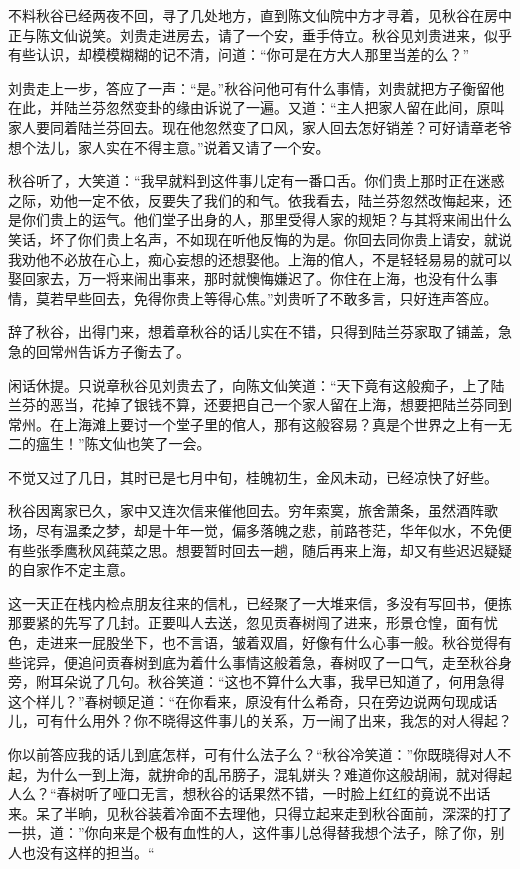\documentclass[12pt,UTF8]{ctexbook}
\begin{document}
{{{不料秋谷已经两夜不回，寻了几处地方，直到陈文仙院中方才寻着，见秋谷在房中正与陈文仙说笑。刘贵走进房去，请了一个安，垂手侍立。秋谷见刘贵进来，似乎有些认识，却模模糊糊的记不清，问道：“你可是在方大人那里当差的么？”

刘贵走上一步，答应了一声：“是。”秋谷问他可有什么事情，刘贵就把方子衡留他在此，并陆兰芬忽然变卦的缘由诉说了一遍。又道：“主人把家人留在此间，原叫家人要同着陆兰芬回去。现在他忽然变了口风，家人回去怎好销差？可好请章老爷想个法儿，家人实在不得主意。”说着又请了一个安。

秋谷听了，大笑道：“我早就料到这件事儿定有一番口舌。你们贵上那时正在迷惑之际，劝他一定不依，反要失了我们的和气。依我看去，陆兰芬忽然改悔起来，还是你们贵上的运气。他们堂子出身的人，那里受得人家的规矩？与其将来闹出什么笑话，坏了你们贵上名声，不如现在听他反悔的为是。你回去同你贵上请安，就说我劝他不必放在心上，痴心妄想的还想娶他。上海的倌人，不是轻轻易易的就可以娶回家去，万一将来闹出事来，那时就懊悔嫌迟了。你住在上海，也没有什么事情，莫若早些回去，免得你贵上等得心焦。”刘贵听了不敢多言，只好连声答应。

辞了秋谷，出得门来，想着章秋谷的话儿实在不错，只得到陆兰芬家取了铺盖，急急的回常州告诉方子衡去了。

闲话休提。只说章秋谷见刘贵去了，向陈文仙笑道：“天下竟有这般痴子，上了陆兰芬的恶当，花掉了银钱不算，还要把自己一个家人留在上海，想要把陆兰芬同到常州。在上海滩上要讨一个堂子里的倌人，那有这般容易？真是个世界之上有一无二的瘟生！”陈文仙也笑了一会。

不觉又过了几日，其时已是七月中旬，桂魄初生，金风未动，已经凉快了好些。

秋谷因离家已久，家中又连次信来催他回去。穷年索寞，旅舍萧条，虽然酒阵歌场，尽有温柔之梦，却是十年一觉，偏多落魄之悲，前路苍茫，华年似水，不免便有些张季鹰秋风莼菜之思。想要暂时回去一趟，随后再来上海，却又有些迟迟疑疑的自家作不定主意。

这一天正在栈内检点朋友往来的信札，已经聚了一大堆来信，多没有写回书，便拣那要紧的先写了几封。正要叫人去送，忽见贡春树闯了进来，形景仓惶，面有忧色，走进来一屁股坐下，也不言语，皱着双眉，好像有什么心事一般。秋谷觉得有些诧异，便追问贡春树到底为着什么事情这般着急，春树叹了一口气，走至秋谷身旁，附耳朵说了几句。秋谷笑道：“这也不算什么大事，我早已知道了，何用急得这个样儿？”春树顿足道：“在你看来，原没有什么希奇，只在旁边说两句现成话儿，可有什么用外？你不晓得这件事儿的关系，万一闹了出来，我怎的对人得起？

你以前答应我的话儿到底怎样，可有什么法子么？“秋谷冷笑道：”你既晓得对人不起，为什么一到上海，就拚命的乱吊膀子，混轧姘头？难道你这般胡闹，就对得起人么？“春树听了哑口无言，想秋谷的话果然不错，一时脸上红红的竟说不出话来。呆了半晌，见秋谷装着冷面不去理他，只得立起来走到秋谷面前，深深的打了一拱，道：”你向来是个极有血性的人，这件事儿总得替我想个法子，除了你，别人也没有这样的担当。“

}}}
\end{document}
